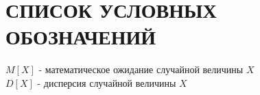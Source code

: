 \section*{СПИСОК УСЛОВНЫХ ОБОЗНАЧЕНИЙ}
${M[X]}$ - математическое ожидание случайной величины $X$	\\
${D[X]}$ - дисперсия случайной величины $X$			\\
\newpage
